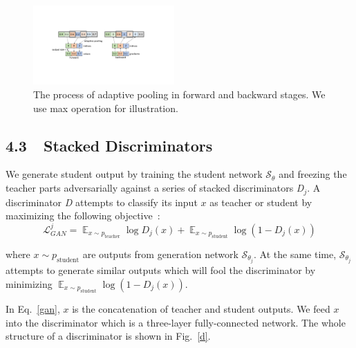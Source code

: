 \documentclass[letterpaper]{article} %
\newcommand{\LL}{\mathcal{L}}
\newcommand{\EE}{\mathop{\mathbb{E}}}
\begin{document}
\begin{figure}[t]
	\centering
	\includegraphics[width=0.48\textwidth]{figs/ap}
	\vspace{-0.22in}
	\caption{The process of adaptive pooling in forward and backward stages. We use max operation for illustration.}
	\label{ap}
	\vspace{-0.2in}
\end{figure}


\subsection{4.3~~Stacked Discriminators} %

We generate student output by training the student network $\mathcal{S}_\theta$ and freezing the teacher parts adversarially against a series of stacked discriminators {\em D}$_j$. A discriminator {\em D} attempts to classify its input $x$ as teacher or student by maximizing the following objective~\cite{goodfellow2014generative}:
\begin{equation}
\LL^j_{GAN} = \EE_{x\sim p_{\textrm{teacher}}} \log D_j(x) + \EE_{x\sim p_{\textrm{student}}} \log(1 - D_j(x))
\end{equation}

where ${x\sim p_{\textrm{student}}}$ are outputs from generation network $\mathcal{S}_{{\theta}_j}$. At the same time, $\mathcal{S}_{{\theta}_j}$ attempts to generate similar outputs which will fool the discriminator by minimizing $\EE_{x\sim p_{\textrm{student}}} \log(1 - D_j(x))$.


In Eq.~\ref{gan}, $x$ is the concatenation of teacher and student outputs. We feed $x$ into the discriminator which is a three-layer fully-connected network. The whole structure of a discriminator is shown in Fig.~\ref{d}.
\end{document}
